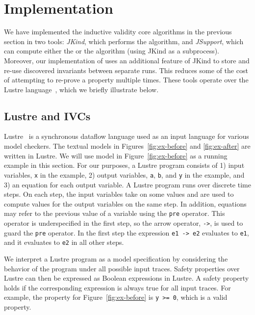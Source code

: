 \section{Implementation}
\label{sec:impl}

We have implemented the inductive validity core algorithms in the
previous section in two tools: {\em JKind}, which performs the \ucalg
algorithm, and {\em JSupport}, which can compute either the \bfalg or
the \ucbfalg algorithm (using JKind as a subprocess). Moreover, our
implementation of \ucbfalg uses an additional feature of JKind to
store and re-use discovered invariants between separate runs. This
reduces some of the cost of attempting to re-prove a property multiple
times. These tools operate over the Lustre
language~\cite{Halbwachs91:lustre}, which we briefly illustrate below.

\vspace{0.1in}

\subsection{Lustre and IVCs}

Lustre~\cite{Halbwachs91:lustre} is a synchronous dataflow language
used as an input language for various model checkers. The textual
models in Figures~\ref{fig:ex-before} and \ref{fig:ex-after} are
written in Lustre. We will use model in Figure~\ref{fig:ex-before} as
a running example in this section. For our purposes, a Lustre program
consists of 1) input variables, {\tt x} in the example, 2) output
variables, {\tt a}, {\tt b}, and {\tt y} in the example, and 3) an
equation for each output variable. A Lustre program runs over discrete
time steps. On each step, the input variables take on some values and
are used to compute values for the output variables on the same step.
In addition, equations may refer to the previous value of a variable
using the {\tt pre} operator. This operator is underspecified in the
first step, so the arrow operator, {\tt ->}, is used to guard the
{\tt pre} operator. In the first step the expression {\tt e1 -> e2}
evaluates to {\tt e1}, and it evaluates to {\tt e2} in all other steps.

We interpret a Lustre program as a model specification by considering
the behavior of the program under all possible input traces. Safety
properties over Lustre can then be expressed as Boolean expressions in
Lustre. A safety property holds if the corresponding expression is
always true for all input traces. For example, the property for
Figure~\ref{fig:ex-before} is {\tt y >= 0}, which is a valid property.

